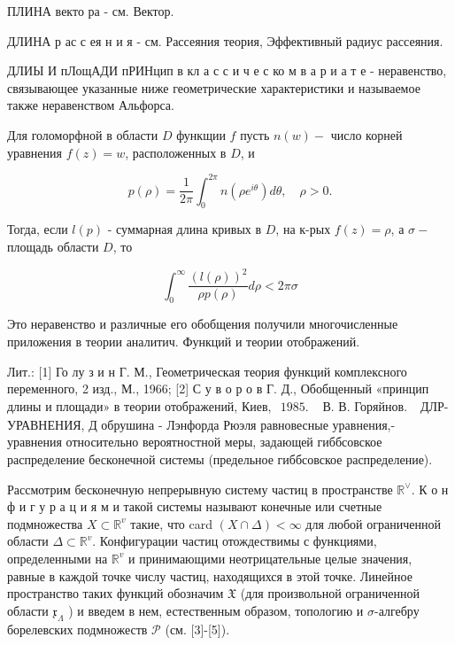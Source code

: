 \documentclass[10pt]{article}
\begin{document}
ПЛИНА векто ра - см. Вектор.



ДЛИНА р ас с ея н и я - см. Рассеяния теория, Эффективный радиус рассеяния.



ДЛИЫ И пЛощАДИ пРИНцип в кл а с с и ч е с ко м в а р и а т е - неравенство, связывающее указанные ниже геометрические характеристики и называемое также неравенством Альфорса.



Для голоморфной в области $D$ функщии $f$ пусть $n(w)-$ число корней уравнения $f(z)=w$, расположенных в $D$, и



\[

p(\rho)=\frac{1}{2 \pi} \int_{0}^{2 \pi} n\left(\rho e^{i \theta}\right) d \theta, \quad \rho>0 .

\]



Тогда, если $l(p)$ - суммарная длина кривых в $D$, на к-рых $f(z)=\rho$, а $\sigma-$ площадь области $D$, то



\[

\int_{0}^{\infty} \frac{(l(\rho))^{2}}{\rho p(\rho)} d \rho<2 \pi \sigma

\]



Это неравенство и различные его обобщения получили многочисленные приложения в теории аналитич. Функций и теории отображений.



Лит.: [1] Го лу з и н Г. М., Геометрическая теория функций комплексного переменного, 2 изд., М., 1966; [2] С у в о р о в Г. Д., Обобщенный «принцип длины и площади» в теории отображений, Киев, $\begin{array}{ll}1985 . & \text { В. В. Горяйнов. }\end{array}$ ДЛР-УРАВНЕНИЯ, Д обрушина - Лэнфорда Рюэля равновесные уравнения,- уравнения относительно вероятностной меры, задающей гиббсовское распределение бесконечной системы (предельное гиббсовское распределение).



Рассмотрим бесконечную непрерывную систему частиц в пространстве $\mathbb{R}^{\vee}$. К о н ф и г у р а ц и я м и такой системы называют конечные или счетные подмножества $X \subset \mathbb{R}^{v}$ такие, что card $(X \cap \Delta)<\infty$ для любой ограниченной области $\Delta \subset \mathbb{R}^{v}$. Конфигурации частиц отождествимы с функциями, определенными на $\mathbb{R}^{v}$ и принимающими неотрицательные целые значения, равные в каждой точке числу частиц, находящихся в этой точке. Линейное пространство таких функций обозначим $\mathfrak{X}$ (для произвольной ограниченной области $\mathfrak{x}_{\Lambda}$ ) и введем в нем, естественным образом, топологию и $\sigma$-алгебру борелевских подмножеств $\mathscr{P}$ (см. [3]-[5]).
\end{document}
